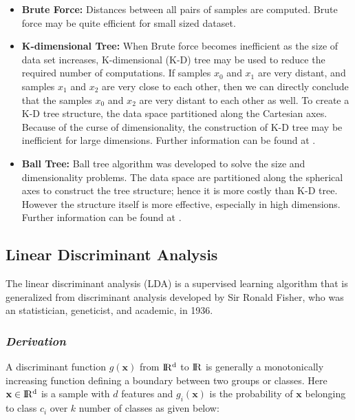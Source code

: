 \begin{itemize}
    \item \textbf{Brute Force:} Distances between all pairs of samples are computed. Brute force may be quite efficient for small sized dataset.
    
    \item \textbf{K-dimensional Tree:} When Brute force becomes inefficient as the size of  data set increases, K-dimensional (K-D) tree may be used to reduce the required number of computations. If samples $x_{0}$ and $x_{1}$ are very distant, and samples $x_{1}$ and $x_{2}$ are very close to each other, then we can directly conclude that the samples $x_{0}$ and $x_{2}$ are very distant to each other as well. To create a K-D tree structure, the data space partitioned along the Cartesian axes. Because of the curse of dimensionality, the construction of K-D tree may be inefficient for large dimensions. Further information can be found at \cite{kd_tree}.
    
    \item \textbf{Ball Tree:} Ball tree algorithm was developed to solve the size and dimensionality problems. The data space are partitioned along the spherical axes to construct the tree structure; hence it is more costly than K-D tree. However the structure itself is more effective, especially in high dimensions. Further information can be found at \cite{ball_tree}.
    
\end{itemize}

\subsection{Linear Discriminant Analysis}

The linear discriminant analysis (LDA) is a supervised learning algorithm that is generalized from discriminant analysis developed by Sir Ronald Fisher, who was an statistician, geneticist, and academic, in 1936.

\subsubsection*{\textit{Derivation}}

A discriminant function $g(\textbf{x})$ from $\rm I\!R^{d}$ to $\rm I\!R$ is generally a monotonically increasing function defining a boundary between two groups or classes. Here $\textbf{x} \in \rm I\!R^{d}$ is a sample with $d$ features and $g_{i}(\textbf{x})$ is the probability of $\textbf{x}$ belonging to class $c_{i}$ over $k$ number of classes as given below:

